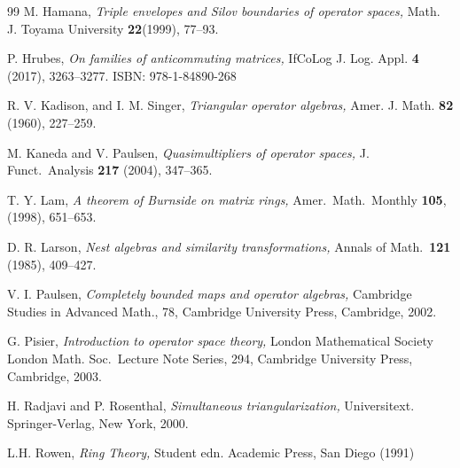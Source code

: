 \documentclass{amsart}
\theoremstyle{remark}
\theoremstyle{definition}
\numberwithin{equation}{section}
\begin{document}
\begin{thebibliography}{99}
 M. Hamana, {\em Triple envelopes and Silov boundaries of operator spaces,} Math. J. Toyama University {\bf 22}(1999), 77--93.

 P. Hrubes, {\em  On families of anticommuting matrices,}  IfCoLog J. Log. Appl. {\bf 4}
 (2017), 3263--3277. ISBN: 978-1-84890-268

  R. V. Kadison, and I. M. Singer, {\em Triangular operator algebras,} Amer. J. Math. {\bf 82} (1960), 227--259.
 
   M. Kaneda and V. Paulsen, {\em Quasimultipliers of operator spaces,} J. Funct.\ Analysis {\bf 217} (2004), 347–365. 

   T. Y. Lam, {\em A theorem of Burnside on matrix rings,}  Amer.\ Math.\ Monthly {\bf 105},  (1998),  651--653.

  D. R. Larson, {\em Nest algebras and similarity transformations,} Annals of Math.\  {\bf 121} (1985), 409--427.
 
 
   V. I. Paulsen, {\em Completely bounded maps and operator
algebras,} Cambridge Studies in Advanced Math., 78, Cambridge
University Press, Cambridge, 2002.


  G. Pisier, {\em Introduction to operator space theory,} London Mathematical Society London Math.
Soc.\ Lecture Note Series, 294, Cambridge University Press, Cambridge, 2003.

 H. Radjavi and P. Rosenthal, {\em  Simultaneous triangularization,} Universitext. Springer-Verlag, New York, 2000.

 L.H. Rowen,  {\em Ring Theory,} Student edn. Academic Press, San Diego (1991)

\end{thebibliography}
\end{document}
